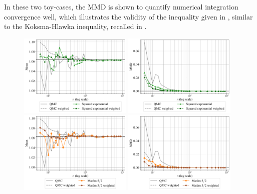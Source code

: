 In these two toy-cases, the MMD is shown to quantify numerical integration convergence well, which illustrates the validity of the inequality given in , similar to the Koksma-Hlawka inequality, recalled in .

\begin{figure}[!h]
\begin{center}
    \includegraphics[width=0.48\textwidth]{part2/figures/DCE/analytical_bench/Gaussian Mixture_convergence_SE.pdf}
    \includegraphics[width=0.48\textwidth]{part2/figures/DCE/analytical_bench/Gaussian Mixture_convergence_MMD_SE.pdf}\\
    \includegraphics[width=0.48\textwidth]{part2/figures/DCE/analytical_bench/Gaussian Mixture_convergence_Matern.pdf}
    \includegraphics[width=0.48\textwidth]{part2/figures/DCE/analytical_bench/Gaussian Mixture_convergence_MMD_Matern.pdf}\\

\end{center}
\end{figure}
